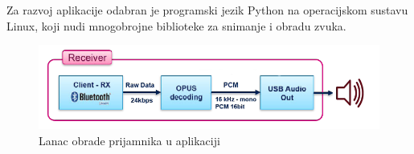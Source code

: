 Za razvoj aplikacije odabran je programski jezik Python na operacijskom sustavu Linux, koji nudi mnogobrojne biblioteke za snimanje i obradu zvuka. 


\begin{figure}[ht]
	\includegraphics[width=\linewidth]{imgs/duplex_chain_2}
	\caption{Lanac obrade prijamnika u aplikaciji}
	\label{fig:duplex_chain_2}
\end{figure}